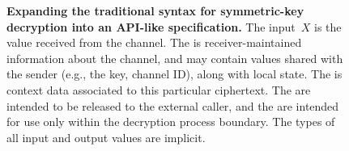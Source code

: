 \begin{figure}
\centering
{} 
%

\caption{{\bf Expanding the traditional syntax for symmetric-key
    decryption 
into an API-like specification.} The input~$X$ is the value received from the
  channel.  The  is
  receiver-maintained information about the channel, and may contain values shared with the sender
  (e.g., the key, channel ID), along with local state.  The
   is context data associated to this particular
  ciphertext. The  are intended to be released
  to the external caller, and the  are intended
  for use only within the decryption process boundary.  
  The types of all input and output values are implicit.}
\label{fig:syntax-api-example}
\end{figure}

